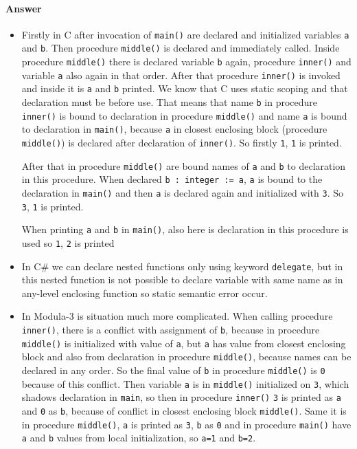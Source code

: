 \documentclass[5pt]{article}
\begin{document}
\paragraph{Answer}
\begin{itemize}
\item Firstly in C after invocation of \verb|main()| are declared and
initialized variables \verb|a| and \verb|b|. Then procedure \verb|middle()| is declared and
immediately called. Inside procedure \verb|middle()| there is declared variable
\verb|b| again, procedure \verb|inner()| and variable \verb|a| also again in
that order. After that procedure \verb|inner()| is invoked and inside it is
\verb|a| and \verb|b| printed. We know that C uses static scoping and that
declaration must be before use. That means that name \verb|b| in procedure
\verb|inner()| is bound to declaration in procedure \verb|middle()| and name
\verb|a| is bound to declaration in \verb|main()|, because \verb|a| in closest
enclosing block (procedure \verb|middle()|) is declared after declaration of
\verb|inner()|. So firstly \verb|1|, \verb|1| is printed.



After that in procedure \verb|middle()| are bound names of \verb|a| and \verb|b|
to declaration in this procedure. When declared \verb|b : integer := a|,
\verb|a| is bound to the declaration in \verb|main()| and then \verb|a| is
declared again and initialized with \verb|3|. So \verb|3|, \verb|1| is printed.

When printing \verb|a| and \verb|b| in \verb|main()|, also here is declaration
in this procedure is used so \verb|1|, \verb|2| is printed


\item In C\# we can declare nested functions only using keyword \verb|delegate|,
but in this nested function is not possible to declare variable with same name as in
any-level enclosing function so static semantic error occur.

\item In Modula-3 is situation much more complicated. When calling procedure
\verb|inner()|, there is a conflict with assignment of \verb|b|, because in
procedure \verb|middle()| is initialized with value of \verb|a|, but \verb|a|
has value from closest enclosing block and also from declaration in procedure
\verb|middle()|, because names can be declared in any order. So the final value
of \verb|b| in procedure \verb|middle()| is \verb|0| because of this conflict.
Then variable \verb|a| is in \verb|middle()| initialized on \verb|3|, which
shadows declaration in \verb|main|, so then in procedure \verb|inner()| \verb|3|
is printed as \verb|a| and \verb|0| as \verb|b|, because of conflict in closest
enclosing block \verb|middle()|. Same it is in procedure \verb|middle()|, \verb|a| is printed as
\verb|3|, \verb|b| as \verb|0| and in procedure \verb|main()| have \verb|a| and
\verb|b| values from local initialization, so \verb|a=1| and \verb|b=2|.
\end{itemize}
\end{document}
